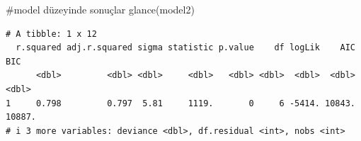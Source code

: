 \documentclass[
  letterpaper,
  DIV=11,
  numbers=noendperiod]{scrreprt}
\newenvironment{Shaded}{\begin{snugshade}}{\end{snugshade}}
\newcommand{\CommentTok}[1]{\textcolor[rgb]{0.37,0.37,0.37}{#1}}
\newcommand{\FunctionTok}[1]{\textcolor[rgb]{0.28,0.35,0.67}{#1}}
\newcommand{\NormalTok}[1]{\textcolor[rgb]{0.00,0.23,0.31}{#1}}
\begin{document}
\begin{Shaded}
\begin{Highlighting}[]
\CommentTok{\#model düzeyinde sonuçlar}
\FunctionTok{glance}\NormalTok{(model2)}
\end{Highlighting}
\end{Shaded}

\begin{verbatim}
# A tibble: 1 x 12
  r.squared adj.r.squared sigma statistic p.value    df logLik    AIC    BIC
      <dbl>         <dbl> <dbl>     <dbl>   <dbl> <dbl>  <dbl>  <dbl>  <dbl>
1     0.798         0.797  5.81     1119.       0     6 -5414. 10843. 10887.
# i 3 more variables: deviance <dbl>, df.residual <int>, nobs <int>
\end{verbatim}
\end{document}
